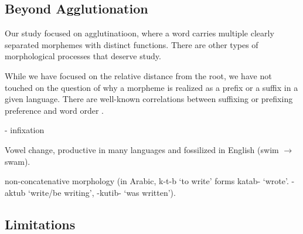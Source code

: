 \documentclass[11pt,letterpaper]{article}
\begin{document}




\subsection{Beyond Agglutionation}

Our study focused on agglutinatioon, where a word carries multiple clearly separated morphemes with distinct functions.
There are other types of morphological processes that deserve study.

While we have focused on the relative distance from the root, we have not touched on the question of why a morpheme is realized as a prefix or a suffix in a given language.
There are well-known correlations between suffixing or prefixing preference and word order \citep{greenberg1963universals}.

- infixation

Vowel change, productive in many languages and fossilized in English (swim $\rightarrow$ swam).

non-concatenative morphology (in Arabic, k-t-b `to write' forms katab- `wrote'. -aktub `write/be writing', -kutib- `was written').

\subsection{Limitations}
\end{document}
